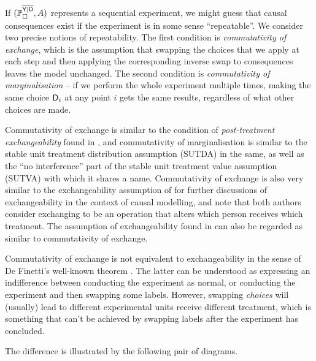 If $(\mathbb{P}_\square^{\overline{\mathsf{Y}|\mathsf{D}}},A)$ represents a sequential experiment, we might guess that causal consequences exist if the experiment is in some sense ``repeatable''. We consider two precise notions of repeatability. The first condition is \emph{commutativity of exchange}, which is the assumption that swapping the choices that we apply at each step and then applying the corresponding inverse swap to consequences leaves the model unchanged. The second condition is \emph{commutativity of marginalisation} -- if we perform the whole experiment multiple times, making the same choice $\mathsf{D}_i$ at any point $i$ gets the same results, regardless of what other choices are made.

Commutativity of exchange is similar to the condition of \emph{post-treatment exchangeability} found in \citet{dawid_decision-theoretic_2020}, and commutativity of marginalisation is similar to the stable unit treatment distribution assumption (SUTDA) in the same, as well as the ``no interference'' part of the stable unit treatment value assumption (SUTVA) with which it shares a name. Commutativity of exchange is also very similar to the exchangeability assumption of \citet{greenland_identifiability_1986} for further discussions of exchangeability in the context of causal modelling, and note that both authors consider exchanging to be an operation that alters which person receives which treatment. The assumption of exchangeability found in \citet{banerjee_chapter_2017} can also be regarded as similar to commutativity of exchange.



Commutativity of exchange is not equivalent to exchangeability in the sense of De Finetti's well-known theorem \citet{de_finetti_foresight_1992}. The latter can be understood as expressing an indifference between conducting the experiment as normal, or conducting the experiment and then swapping some labels. However, swapping \emph{choices} will (usually) lead to different experimental units receive different treatment, which is something that can't be achieved by swapping labels after the experiment has concluded.

The difference is illustrated by the following pair of diagrams.

